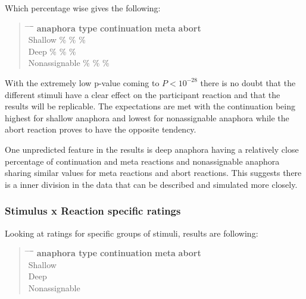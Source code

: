 Which percentage wise gives the following:

\begin{quote}
\begin{tabbing}
\hspace{4cm} \= \hspace{3cm} \= \hspace{3cm} \= \= \hspace{3cm} \kill %
\textbf{anaphora type} \> \textbf{continuation} \> \textbf{meta} \> \textbf{abort} \\
Shallow         \% \% \% \\
Deep            \% \% \% \\
Nonassignable   \% \% \% \\
\end{tabbing}
\end{quote}

With the extremely low p-value coming to $P < 10^{-28}$
 there is no doubt
that the different stimuli have a clear effect on the participant reaction and
that the results will be replicable.
The expectations are met with the continuation being highest for shallow anaphora
and lowest for nonassignable anaphora while
the abort reaction proves to have the opposite tendency.

One unpredicted feature in the results is
deep anaphora having a relatively close percentage of continuation and meta reactions and
nonassignable anaphora sharing similar values for meta reactions and abort reactions.
This suggests there is a inner division in the data that can be described and simulated more closely.

\subsubsection{Stimulus x Reaction specific ratings}

Looking at ratings for specific groups of stimuli, results are following:

\begin{quote}
\begin{tabbing}
\hspace{4cm} \= \hspace{3cm} \= \hspace{3cm} \= \= \hspace{3cm} \kill %
\textbf{anaphora type} \> \textbf{continuation} \> \textbf{meta} \> \textbf{abort} \\
Shallow    \\
Deep    \\
Nonassignable    \\
\end{tabbing}
\end{quote}

